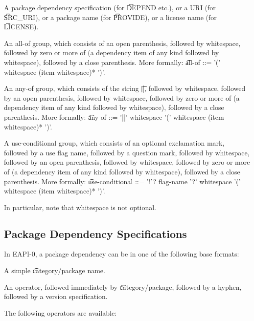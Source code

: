 \begin{bulletlist}
\item A package dependency specification (for \t{DEPEND} etc.), or a URI (for \t{SRC\_URI}),
    or a package name (for \t{PROVIDE}), or a license name (for \t{LICENSE}).
\item An all-of group, which consists of an open parenthesis, followed by whitespace,
    followed by zero or more of (a dependency item of any kind followed by whitespace), followed
    by a close parenthesis. More formally:
    \t{all-of ::= '(' whitespace (item whitespace)* ')'}.
\item An any-of group, which consists of the string \t{||}, followed by whitespace,
    followed by an open parenthesis, followed by whitespace, followed by zero or more
    of (a dependency item of any kind followed by whitespace), followed by a close parenthesis.
    More formally: \t{any-of ::= '||' whitespace '(' whitespace (item whitespace)* ')'}.
\item A use-conditional group, which consists of an optional exclamation mark, followed by
    a use flag name, followed by a question mark, followed by whitespace, followed by
    an open parenthesis, followed by whitespace, followed by zero or more of (a dependency item
    of any kind followed by whitespace), followed by a close parenthesis. More formally:
    \t{use-conditional ::= '!'? flag-name '?' whitespace '(' whitespace (item whitespace)* ')'}.
\end{bulletlist}

In particular, note that whitespace is not optional.

\subsection{Package Dependency Specifications}

In EAPI-0, a package dependency can be in one of the following base formats:

\begin{bulletlist}
\item A simple \t{category/package} name.
\item An operator, followed immediately by \t{category/package}, followed by a hyphen,
   followed by a version specification.
\end{bulletlist}


The following operators are available:

